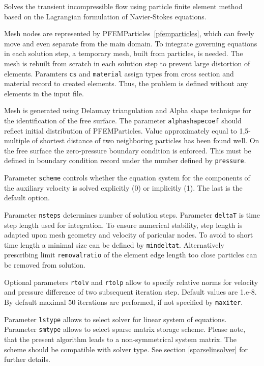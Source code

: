 \documentclass[a4paper]{report}
\newcommand{\param}[1]{\texttt{#1}} %
\begin{document}
Solves the transient incompressible flow using particle finite element
method based on the Lagrangian formulation of Navier-Stokes equations.

Mesh nodes are represented by PFEMParticles~\ref{pfemparticles}, which 
can freely move and even separate from the main domain. To integrate 
governing equations in each solution step, a temporary mesh, built from 
particles, is needed. The mesh is rebuilt from scratch in each solution 
step to prevent large distortion of elements. Paramters \param{cs} and
\param{material} assign types from cross section and material record to 
created elements. Thus, the problem is defined without any elements in
the input file.

Mesh is generated using Delaunay triangulation and Alpha shape technique
for the identification of the free surface. The parameter
\param{alphashapecoef} should reflect initial distribution of PFEMParticles.
Value approximately equal to 1,5-multiple of shortest distance of two 
neighboring particles has been found well. On the free surface the zero-pressure
boundary condition is enforced. This  must be defined in boundary condition
record under the number defined by \param{pressure}.

Parameter \param{scheme} controls whether the  equation system for the 
components of the auxiliary velocity is solved explicitly (0) or implicitly
(1). The last is the default option.

Parameter \param{nsteps} determines number of solution
steps. Parameter \param{deltaT} is time step length used for
integration. To ensure numerical stability, step length is adapted upon mesh
geometry and velocity of paricular nodes. To avoid to short time length a minimal
size can be defined by \param{mindeltat}. Alternatively prescribing limit
\param{removalratio} of the element edge length too close particles can be removed
from solution.

Optional parameters \param{rtolv} and \param{rtolp} allow to
specify relative norms for velocity and pressure difference of two subsequent iteration
step. Default values are 1.e-8. By default maximal 50 iterations are performed, if
not specified by \param{maxiter}.

Parameter \param{lstype} allows to select solver for linear system of
equations. Parameter \param{smtype} allows to select sparse matrix storage
scheme. Please note, that the present algorithm leads to a
non-symmetrical system
matrix. The scheme should be compatible with solver type. See section
\ref{sparselinsolver} for further details.
\end{document}
